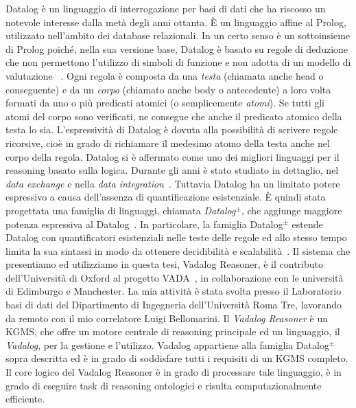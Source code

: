 Datalog è un linguaggio di interrogazione per basi di dati che ha riscosso un notevole interesse dalla metà degli anni ottanta. È un linguaggio affine al Prolog, utilizzato nell'ambito dei database relazionali. In un certo senso è un sottoinsieme di Prolog poiché, nella sua versione base, Datalog è basato su regole di deduzione che non permettono l'utilizzo di simboli di funzione e non adotta di un modello di valutazione~\cite{atzeni2006basi} . \newline
Ogni regola è composta da una \emph{testa} (chiamata anche head o conseguente) e da un \emph{corpo} (chiamato anche body o antecedente) a loro volta formati da uno o più predicati atomici (o semplicemente \emph{atomi}). Se tutti gli atomi del corpo sono verificati, ne consegue che anche il predicato atomico della testa lo sia. L'espressività di Datalog è dovuta alla possibilità di scrivere regole ricorsive, cioè in grado di richiamare il medesimo atomo della testa anche nel corpo della regola. \newline
Datalog si è affermato come uno dei migliori linguaggi per il reasoning basato sulla logica. Durante gli anni è stato studiato in dettaglio, nel \emph{data exchange} e nella \emph{data integration}~\cite{furche2016data}. \newline
Tuttavia Datalog ha un limitato potere espressivo a causa dell'assenza di quantificazione esistenziale. È quindi stata progettata una famiglia di linguaggi, chiamata \emph{Datalog$^\pm$}, che aggiunge maggiore potenza espressiva al Datalog~\cite{bellomarini2017swift}. \newline 
In particolare, la famiglia Datalog$^\pm$ estende Datalog con quantificatori esistenziali nelle teste delle regole ed allo stesso tempo limita la sua sintassi in modo da ottenere decidibilità e scalabilità~\cite{cali2013taming,cali2012towards,cali2010datalog+}.  \newline \newline
Il sistema che presentiamo ed utilizziamo in questa tesi, Vadalog Reasoner, è il contributo dell'Università di Oxford al progetto VADA~\cite{VADA}, in collaborazione con le università di Edimburgo e Manchester. La mia attività è stata svolta presso il Laboratorio basi di dati del Dipartimento di Ingegneria dell'Università Roma Tre, lavorando da remoto con il mio correlatore Luigi Bellomarini. \newline
Il \emph{Vadalog Reasoner} è un KGMS, che offre un motore centrale di reasoning principale ed un linguaggio, il \emph{Vadalog}, per la gestione e l'utilizzo. Vadalog appartiene alla famiglia Datalog$^\pm$ sopra descritta ed è in grado di soddisfare tutti i requisiti di un KGMS completo. Il core logico del Vadalog Reasoner è in grado di processare tale linguaggio, è in grado di eseguire task di reasoning ontologici e risulta computazionalmente efficiente. \newline
